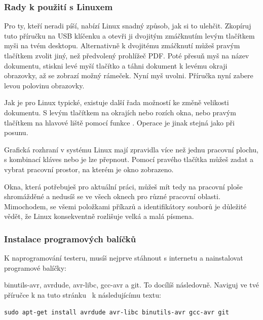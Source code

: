\subsubsection{Rady k použití s Linuxem}
Pro ty, kteří neradi píší, nabízí Linux snadný způsob, jak si to ulehčit.
Zkopíruj tuto příručku na USB klíčenku a otevři ji dvojitým zmáčknutím levým tlačítkem myši \LMB na tvém desktopu.
Alternativně k dvojitému zmáčknutí můžeš pravým tlačítkem \RMB zvolit jiný, než předvolený prohlížeč PDF.   
Poté přesuň myš na název dokumentu, stiskni levé \LMB myší tlačítko a táhni dokument k levému okraji obrazovky, až se zobrazí možný rámeček. Nyní  myš uvolni.
Příručka nyní zabere levou polovinu obrazovky.
 
Jak je pro Linux typické, existuje další řada možností ke změně velikosti dokumentu. S levým tlačítkem \LMB na okrajích nebo rozích okna, 
nebo pravým tlačítkem \RMB na hlavové liště pomocí funkce .
Operace je jinak stejná jako při posunu.

Grafická rozhraní v systému Linux mají zpravidla více než jednu pracovní plochu,
s kombinací kláves 
nebo  je lze přepnout.
Pomocí pravého tlačítka \RMB můžeš zadat a vybrat pracovní prostor, na kterém je okno zobrazeno.

Okna, která potřebuješ pro aktuální práci, můžeš mít tedy na pracovní ploše shromážděné a nedusíš se ve všech oknech pro různé pracovní oblasti.
Mimochodem, se všemi položkami příkazů a identifikátory souborů je důležité vědět, že Linux konsekventně rozlišuje velká a malá písmena.
\vspace*{-0.3em}  
\subsubsection{Instalace programových balíčků}
\label{paket}
K naprogramování testeru, musíš nejprve stáhnout s internetu a nainstalovat programové balíčky:

 binutils-avr, avrdude, avr-libc, gcc-avr a git.
 To docílíš následovně. Naviguj ve tvé příručce k na tuto stránku~\pageref{paket} k následujícímu textu:

\begin{large} \vspace{-0.4em} \begin{verbatim}
sudo apt-get install avrdude avr-libc binutils-avr gcc-avr git
\end{verbatim} \end{large}
 
